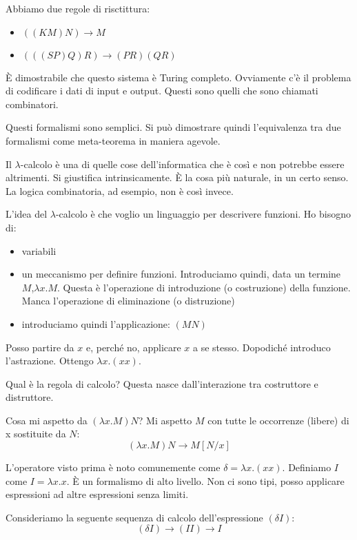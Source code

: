 Abbiamo due regole di risctittura:
\begin{itemize}
    \item $((K M) N) \to M$ 
    \item $(((S P) Q) R) \to (P R) (Q R)$
\end{itemize}

È dimostrabile che questo sistema è Turing completo. Ovviamente c'è il problema di codificare i
dati di input e output. Questi sono quelli che sono chiamati combinatori.

Questi formalismi sono semplici. Si può dimostrare quindi l'equivalenza tra due formalismi come
meta-teorema in maniera agevole.

Il $\lambda$-calcolo è una di quelle cose dell'informatica che è così e non potrebbe essere
altrimenti. Si giustifica intrinsicamente. È la cosa più naturale, in un certo senso. La logica
combinatoria, ad esempio, non è così invece.

L'idea del $\lambda$-calcolo è che voglio un linguaggio per descrivere funzioni. Ho bisogno di:
\begin{itemize}
    \item variabili
    \item un meccanismo per definire funzioni. Introduciamo quindi, data un termine $M$,$\lambda
    x. M$. Questa è l'operazione di introduzione (o costruzione) della funzione. Manca l'operazione di
    eliminazione (o distruzione)
    \item introduciamo quindi l'applicazione: $(M N)$
\end{itemize}
Posso partire da $x$ e, perché no, applicare $x$ a se stesso. Dopodiché introduco l'astrazione.
Ottengo $\lambda x. (x x)$.

Qual è la regola di calcolo? Questa nasce dall'interazione tra costruttore e distruttore.

Cosa mi aspetto da $(\lambda x. M) N$? Mi aspetto $M$ con tutte le occorrenze (libere) di x sostituite
da $N$:
\begin{equation*}
    (\lambda x. M) N \to M[N/x]
\end{equation*}

L'operatore visto prima è noto comunemente come $\delta = \lambda x. (x x)$. Definiamo $I$ come $I =
\lambda x. x$. È un formalismo di alto livello. Non ci sono tipi, posso applicare espressioni ad
altre espressioni senza limiti.

Consideriamo la seguente sequenza di calcolo dell'espressione $(\delta I)$:
\begin{equation*}
    (\delta I) \to (I I) \to I
\end{equation*}

